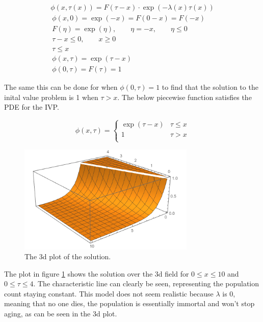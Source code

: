 \documentclass[paper=a4, fontsize=11pt]{scrartcl} %
\numberwithin{equation}{section} %
\numberwithin{figure}{section} %
\numberwithin{table}{section} %
\begin{document}
	\begin{align}
		\phi(x, \tau(x)) = F(\tau-x)\cdot\exp(-\lambda(x)\tau(x)) \\
		~
		\phi(x,0) = \exp(-x) = F(0-x) = F(-x) \\
		~
		F(\eta) = \exp(\eta), \qquad \eta = -x, \qquad \eta \le 0 \\
		~
		\tau - x \le 0, \qquad x \ge 0 \\
		~
		\tau \le x \\
		~
		\phi(x,\tau) = \exp(\tau-x) \\
		~
		\phi(0, \tau) = F(\tau) = 1
	\end{align}

The same this can be done for when $\phi(0,\tau) = 1$ to find that the solution to the inital value problem is 1 when $\tau > x$. The below piecewise function satisfies the PDE for the IVP.

\[
	\phi(x,\tau) = \begin{cases} 
		\exp(\tau-x) 	& \tau\leq x \\
    	1 				& \tau > x \\
   \end{cases}
\]


\begin{figure}[h]\label{prob1:3d}
	\centering
	\includegraphics[width=0.75\textwidth]{bvp1}
	\caption{The 3d plot of the solution.}
\end{figure}

The plot in figure \ref{prob1:3d} shows the solution over the 3d field for $0\le x\le10$ and $0 \le \tau \le 4$. The characteristic line can clearly be seen, representing the population count staying constant. This model does not seem realistic because $\lambda$ is 0, meaning that no one dies, the population is essentially immortal and won't stop aging, as can be seen in the 3d plot.
\end{document}
